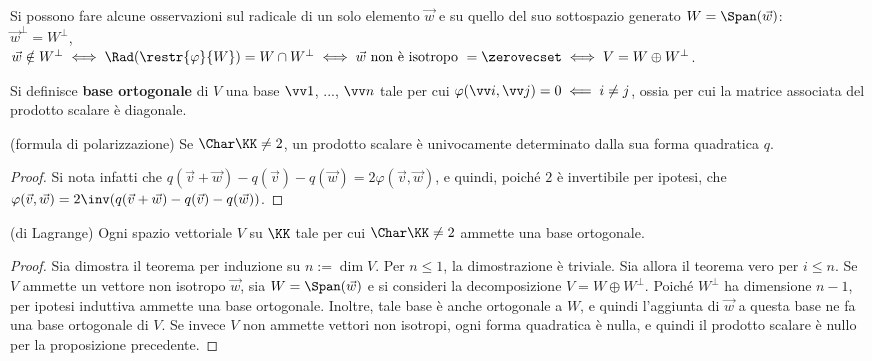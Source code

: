 \begin{remark}
	Si possono fare alcune osservazioni sul radicale di un solo elemento $\vec w$ e su quello del suo sottospazio
	generato $W = \Span(\vec w)$: \\
	
	\li $\vec w ^\perp = W^\perp$, \\
	\li $\vec w \notin W^\perp \iff \Rad (\restr{\varphi}{W}) = W \cap W^\perp \iff \vec w \text{ non è isotropo } = \zerovecset \iff
	V = W \oplus W^\perp$.
\end{remark}

\begin{definition}
	Si definisce \textbf{base ortogonale} di $V$ una base $\vv 1$, ..., $\vv n$ tale per cui $\varphi(\vv i, \vv j) = 0
	\impliedby i \neq j$, ossia per cui la matrice associata del prodotto scalare è diagonale. 
\end{definition}

\begin{proposition} (formula di polarizzazione)
	Se $\Char \KK \neq 2$, un prodotto scalare è univocamente determinato dalla sua forma quadratica $q$.
\end{proposition}

\begin{proof}
	Si nota infatti che $q(\vec v + \vec w) - q(\vec v) - q(\vec w) = 2 \varphi(\vec v, \vec w)$, e quindi,
	poiché $2$ è invertibile per ipotesi, che $\varphi(\vec v, \vec w) = 2\inv (q(\vec v + \vec w) - q(\vec v) - q(\vec w))$.
\end{proof}

\begin{theorem}(di Lagrange)
	Ogni spazio vettoriale $V$ su $\KK$ tale per cui $\Char \KK \neq 2$ ammette una base ortogonale.
\end{theorem}

\begin{proof}
	Sia dimostra il teorema per induzione su $n := \dim V$. Per $n \leq 1$, la dimostrazione è triviale. Sia
	allora il teorema vero per $i \leq n$. Se $V$ ammette un vettore non isotropo $\vec w$, sia $W = \Span(\vec w)$ e si consideri la decomposizione $V = W \oplus W^\perp$. Poiché $W^\perp$ ha dimensione $n-1$, per ipotesi induttiva
	ammette una base ortogonale. Inoltre, tale base è anche ortogonale a $W$, e quindi l'aggiunta di $\vec w$ a
	questa base ne fa una base ortogonale di $V$. Se invece $V$ non ammette vettori non isotropi, ogni forma quadratica
	è nulla, e quindi il prodotto scalare è nullo per la proposizione precedente.
\end{proof}


